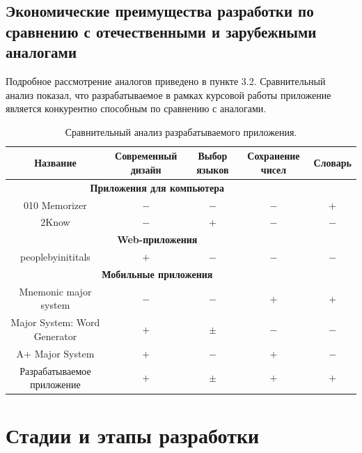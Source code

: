 \documentclass[draft]{article}
\begin{document}
\subsection{Экономические преимущества разработки по сравнению с отечественными и
зарубежными аналогами}
Подробное рассмотрение аналогов приведено в пункте 3.2. Сравнительный анализ показал, что разрабатываемое в рамках курсовой работы приложение является конкурентно способным по сравнению с аналогами.
\begin{table}[H]
\caption{\label{tab:canonsummary}Сравнительный анализ разрабатываемого приложения.}
\begin{center}
\begin{tabular}{|c|c|c|c|c|}
\hline
\textbf{Название} & \textbf{Современный дизайн} & \textbf{Выбор языков} & \textbf{Сохранение чисел} & \textbf{Словарь}\\
\hline
\multicolumn{4}{|c|}{\textbf{Приложения для компьютера}} \\
\hline
010 Memorizer
& $-$
& $-$
& $-$
& $+$ \\
\hline
2Know
& $-$
& $+$
& $-$
& $-$ \\
\hline
\multicolumn{4}{|c|}{\textbf{Web-приложения}} \\
\hline
peoplebyinititals
& $+$
& $-$
& $-$
& $-$ \\
\hline
\multicolumn{4}{|c|}{\textbf{Мобильные приложения}} \\
\hline
Mnemonic major system
& $-$
& $-$
& $+$
& $+$ \\
\hline
Major System: Word Generator
& $+$
& $\pm$
& $-$
& $-$ \\
\hline
A+ Major System
& $+$
& $-$
& $+$
& $-$ \\
\hline
Разрабатываемое приложение
& $+$
& $\pm$
& $+$
& $+$ \\
\hline
\end{tabular}
\end{center}
\end{table} 
\newpage
\section {Стадии и этапы разработки}
\end{document}
